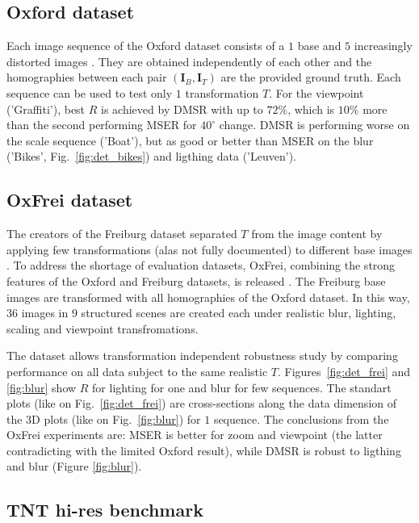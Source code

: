 \documentclass{article}
\def\I{{\mathbf I}}
\begin{document}
\subsection{Oxford dataset}
\label{ssec:oxford}
Each image sequence of the Oxford dataset consists of a $1$ base and $5$ increasingly distorted images \cite{Mikolajczyk:2005}. They are obtained independently of each other and the homographies between each pair $(\I_B,\I_T)$ are the provided  ground truth. Each sequence can be used to test only $1$ transformation $T$.
For the viewpoint ('Graffiti'), best $R$ is achieved by DMSR with up to $72\%$, which is $10\%$ more than the second performing MSER for $40^{\circ}$ change. DMSR is performing worse on the scale sequence ('Boat'), but as good or better than MSER on the blur ('Bikes', Fig.~\ref{fig:det_bikes}) and ligthing data ('Leuven').

\subsection{OxFrei dataset}
\label{ssec:combined}
The creators of the Freiburg dataset separated $T$ from the image content by applying few transformations (alas not fully documented) to different base images \cite{FischerDB14}. To address the shortage of evaluation datasets, OxFrei, combining the strong features of the Oxford and Freiburg datasets, is released \cite{Rang:dataset}. The Freiburg base images are transformed with all homographies of the Oxford dataset. In this way, $36$ images in $9$ structured scenes are created each under realistic blur, lighting, scaling and viewpoint transfromations.

The dataset allows transformation independent robustness study by comparing performance on all data subject to the same realistic $T$. Figures~\ref{fig:det_frei} and \ref{fig:blur} show $R$ for lighting for one and blur for few sequences. The standart plots (like on Fig.~\ref{fig:det_frei}) are cross-sections along the data dimension of the 3D plots (like on Fig.~\ref{fig:blur}) for $1$ sequence. The conclusions from the OxFrei experiments are: MSER is better for zoom and viewpoint (the latter contradicting with the limited Oxford result), while DMSR is robust to ligthing and blur (Figure \ref{fig:blur}).

\subsection{TNT hi-res benchmark}
\label{ssec:tnt}
\end{document}
